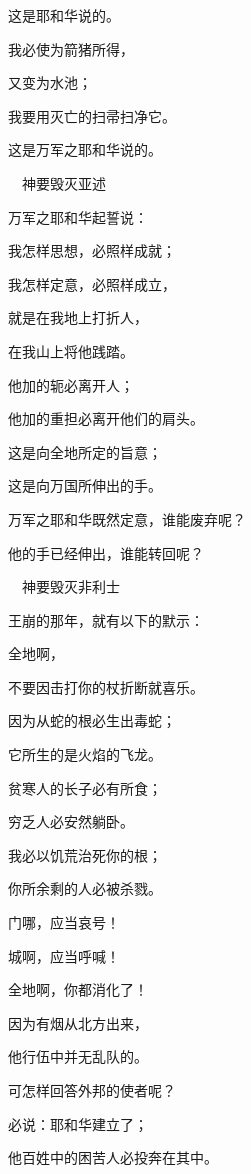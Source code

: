 {\par }{\Q 这是耶和华说的。
\par }{\Q {}我必使{}为箭猪所得，
\par }{\Q 又变为水池；
\par }{\Q 我要用灭亡的扫帚扫净它。
\par }{\Q 这是万军之耶和华说的。
\par }{\SH 　神要毁灭亚述
\par }{\Q {}万军之耶和华起誓说：
\par }{\Q 我怎样思想，必照样成就；
\par }{\Q 我怎样定意，必照样成立，
\par }{\Q {}就是在我地上打折{}人，
\par }{\Q 在我山上将他践踏。
\par }{\Q 他加的轭必离开{}人；
\par }{\Q 他加的重担必离开他们的肩头。
\par }{\Q {}这是向全地所定的旨意；
\par }{\Q 这是向万国所伸出的手。
\par }{\Q {}万军之耶和华既然定意，谁能废弃呢？
\par }{\Q 他的手已经伸出，谁能转回呢？
\par }{\SH 　神要毁灭非利士
\par }{\Q {}王崩的那年，就有以下的默示：
\par }{\Q {}全地啊，
\par }{\Q 不要因击打你的杖折断就喜乐。
\par }{\Q 因为从蛇的根必生出毒蛇；
\par }{\Q 它所生的是火焰的飞龙。
\par }{\Q {}贫寒人的长子必有所食；
\par }{\Q 穷乏人必安然躺卧。
\par }{\Q 我必以饥荒治死你的根；
\par }{\Q 你所余剩的人必被杀戮。
\par }{\Q {}门哪，应当哀号！
\par }{\Q 城啊，应当呼喊！
\par }{全地啊，你都消化了！
\par }{\Q 因为有烟从北方出来，
\par }{\Q 他行伍中并无乱队的。
\par }{\BB \par }{\Q {}可怎样回答外邦的使者呢？
\par }{\Q 必说：耶和华建立了{}；
\par }{\Q 他百姓中的困苦人必投奔在其中。

}
